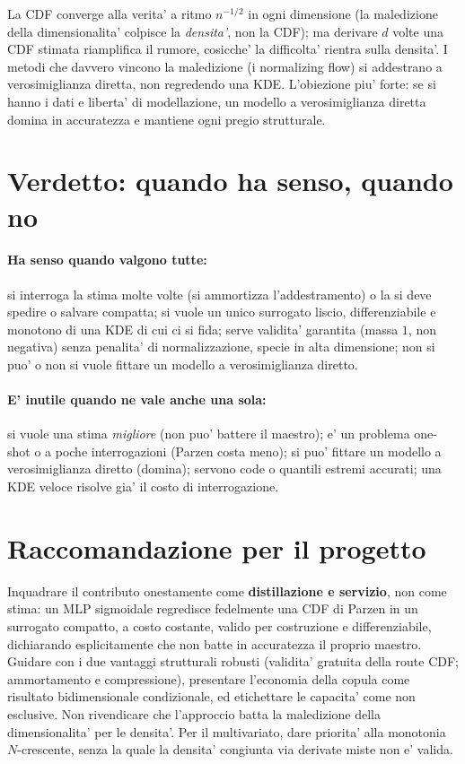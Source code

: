 \documentclass[11pt]{article}
\begin{document}
La CDF converge alla verita' a ritmo $n^{-1/2}$ in ogni dimensione (la maledizione della
dimensionalita' colpisce la \emph{densita'}, non la CDF); ma derivare $d$ volte una CDF stimata
riamplifica il rumore, cosicche' la difficolta' rientra sulla densita'. I metodi che davvero vincono la
maledizione (i normalizing flow) si addestrano a verosimiglianza diretta, non regredendo una KDE.
L'obiezione piu' forte: se si hanno i dati e liberta' di modellazione, un modello a verosimiglianza
diretta domina in accuratezza e mantiene ogni pregio strutturale.

\section{Verdetto: quando ha senso, quando no}

\paragraph{Ha senso quando valgono tutte:} si interroga la stima molte volte (si ammortizza
l'addestramento) o la si deve spedire o salvare compatta; si vuole un unico surrogato liscio,
differenziabile e monotono di una KDE di cui ci si fida; serve validita' garantita (massa $1$, non
negativa) senza penalita' di normalizzazione, specie in alta dimensione; non si puo' o non si vuole
fittare un modello a verosimiglianza diretto.

\paragraph{E' inutile quando ne vale anche una sola:} si vuole una stima \emph{migliore} (non puo'
battere il maestro); e' un problema one-shot o a poche interrogazioni (Parzen costa meno); si puo'
fittare un modello a verosimiglianza diretto (domina); servono code o quantili estremi accurati; una
KDE veloce risolve gia' il costo di interrogazione.

\section{Raccomandazione per il progetto}

Inquadrare il contributo onestamente come \textbf{distillazione e servizio}, non come stima: un MLP
sigmoidale regredisce fedelmente una CDF di Parzen in un surrogato compatto, a costo costante, valido
per costruzione e differenziabile, dichiarando esplicitamente che non batte in accuratezza il proprio
maestro. Guidare con i due vantaggi strutturali robusti (validita' gratuita della route CDF;
ammortamento e compressione), presentare l'economia della copula come risultato bidimensionale
condizionale, ed etichettare le capacita' come non esclusive. Non rivendicare che l'approccio batta la
maledizione della dimensionalita' per le densita'. Per il multivariato, dare priorita' alla monotonia
$N$-crescente, senza la quale la densita' congiunta via derivate miste non e' valida.
\end{document}
